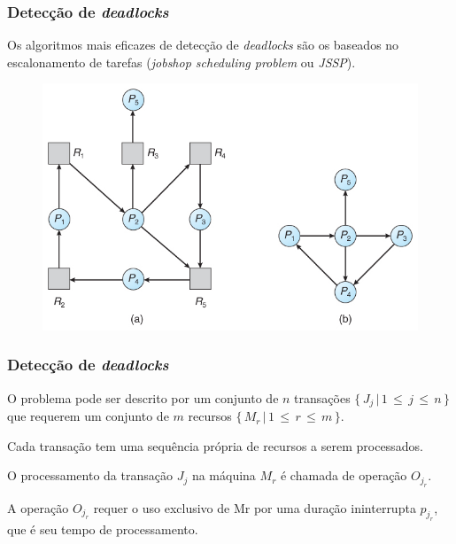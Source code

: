 \documentclass{beamer}
\begin{document}
\begin{frame} %
    \frametitle{Detecção de \emph{deadlocks}}

    Os algoritmos mais eficazes de detecção de \emph{deadlocks} são os baseados no escalonamento de tarefas (\emph{jobshop scheduling problem} ou \emph{JSSP}).

    \medskip
    \begin{figure}
        \includegraphics[width=0.75\linewidth]{deadlockdetection1.jpg}
    \end{figure}
\end{frame}


\begin{frame} %
    \frametitle{Detecção de \emph{deadlocks}}

    \begin{theorem}
        O problema pode ser descrito por um conjunto de \(n\) transações \(\{\, J_{j} \, | \, 1 \, \leq \, j \, \leq \, n\, \}\) que requerem um conjunto de \(m\) recursos \(\{\, M_{r} \, | \, 1 \, \leq \, r \, \leq \, m\, \}\).

        \medskip
        Cada transação tem uma sequência própria de recursos a serem processados.

        \medskip
        O processamento da transação \(J_j\) na máquina \(M_r\) é chamada de operação \(O_{j_{r}}\).

        \medskip
        A operação \(O_{j_{r}}\) requer o uso exclusivo de Mr por uma duração ininterrupta \(p_{j_{r}}\), que é seu tempo de processamento.
        
    \end{theorem}

\end{frame}

\end{document}
